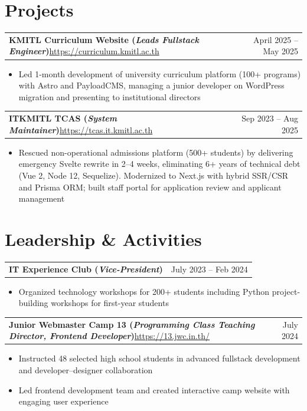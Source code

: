 \documentclass[letterpaper,9pt]{extarticle}
\makeatletter
\newcommand{\entry}[2]{%
  \vspace{0.6ex}%
  \noindent\begin{tabularx}{\textwidth}{@{}X r@{}}
    \textbf{#1} & #2 \\
  \end{tabularx}%
  \vspace{-0.2ex}%
}
\newcommand{\entrylink}[4]{%
  \vspace{0.6ex}%
  \noindent\begin{tabularx}{\textwidth}{@{}X r@{}}
    \textbf{#1}\hspace{0.6em}\href{#3}{\small #2} & #4 \\
  \end{tabularx}%
  \vspace{-0.2ex}%
}
\newcommand{\role}[1]{(\textit{#1})}
\makeatother
\begin{document}
\section{Projects}

\entrylink{KMITL Curriculum Website \role{Leads Fullstack Engineer}}{https://curriculum.kmitl.ac.th}{https://curriculum.kmitl.ac.th}{April 2025 -- May 2025}
\begin{itemize}
  \item Led 1-month development of university curriculum platform (100+ programs) with Astro and PayloadCMS, managing a junior developer on WordPress migration and presenting to institutional directors
\end{itemize}

\entrylink{ITKMITL TCAS \role{System Maintainer}}{https://tcas.it.kmitl.ac.th}{https://tcas.it.kmitl.ac.th}{Sep 2023 -- Aug 2025}
\begin{itemize}
  \item Rescued non-operational admissions platform (500+ students) by delivering emergency Svelte rewrite in 2--4 weeks, eliminating 6+ years of technical debt (Vue 2, Node 12, Sequelize). Modernized to Next.js with hybrid SSR/CSR and Prisma ORM; built staff portal for application review and applicant management
\end{itemize}

\section{Leadership \& Activities}

\entry{IT Experience Club \role{Vice-President}}{July 2023 -- Feb 2024}
\begin{itemize}
  \item Organized technology workshops for 200+ students including Python project-building workshops for first-year students
\end{itemize}

\entrylink{Junior Webmaster Camp 13 \role{Programming Class Teaching Director, Frontend Developer}}{https://13.jwc.in.th/}{https://13.jwc.in.th/}{July 2024}
\begin{itemize}
  \item Instructed 48 selected high school students in advanced fullstack development and developer--designer collaboration
  \item Led frontend development team and created interactive camp website with engaging user experience
\end{itemize}
\end{document}

